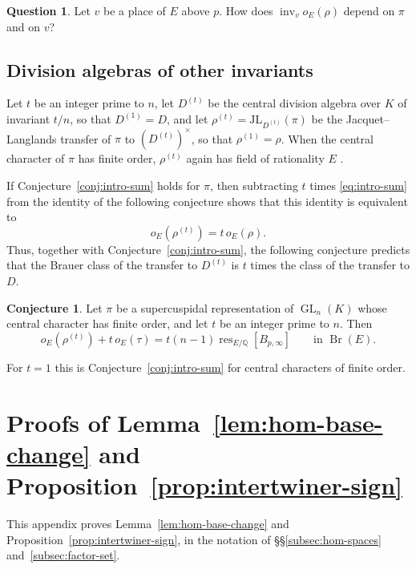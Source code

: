 \documentclass[a4paper,11pt]{amsart}
\theoremstyle{definition}
\newtheorem{conjecture}[theorem]{Conjecture}
\newtheorem{question}[theorem]{Question}
\theoremstyle{remark}
\numberwithin{equation}{section}
\newcommand{\Q}{\mathbb{Q}}
\DeclareMathOperator{\Br}{Br}
\DeclareMathOperator{\inv}{inv}
\DeclareMathOperator{\res}{res}
\DeclareMathOperator{\GL}{GL}
\newcommand{\JL}{\mathrm{JL}}
\newcommand{\Bpinf}{B_{p,\infty}}
\begin{document}
\begin{question}\label{q:individual}
Let $v$ be a place of $E$ above $p$. How does $\inv_vo_E(\rho)$ depend on $\pi$ and on $v$?
\end{question}

\subsection{Division algebras of other invariants}\label{subsec:questions-inner}

Let $t$ be an integer prime to $n$, let $D^{(t)}$ be the central division algebra over $K$ of invariant $t/n$, so that $D^{(1)}=D$, and let $\rho^{(t)}=\JL_{D^{(t)}}(\pi)$ be the Jacquet--Langlands transfer of $\pi$ to $(D^{(t)})^\times$, so that $\rho^{(1)}=\rho$. When the central character of $\pi$ has finite order, $\rho^{(t)}$ again has field of rationality $E$ \cite[Lemma~4.0.3]{Su23}.

If Conjecture~\ref{conj:intro-sum} holds for $\pi$, then subtracting $t$ times \eqref{eq:intro-sum} from the identity of the following conjecture shows that this identity is equivalent to
\[
 o_E(\rho^{(t)})=t\,o_E(\rho).
\]
Thus, together with Conjecture~\ref{conj:intro-sum}, the following conjecture predicts that the Brauer class of the transfer to $D^{(t)}$ is $t$ times the class of the transfer to $D$.

\begin{conjecture}\label{conj:questions-inner-forms}
Let $\pi$ be a supercuspidal representation of $\GL_n(K)$ whose central character has finite order, and let $t$ be an integer prime to $n$. Then
\[
 o_E(\rho^{(t)})+t\,o_E(\tau)=t(n-1)\res_{E/\Q}[\Bpinf]\qquad\text{in }\Br(E).
\]
\end{conjecture}

For $t=1$ this is Conjecture~\ref{conj:intro-sum} for central characters of finite order.

\appendix

\section{Proofs of \texorpdfstring{Lemma~\ref{lem:hom-base-change} and Proposition~\ref{prop:intertwiner-sign}}{Lemma 2.5 and Proposition 2.12}}
\label{app:section-two-proofs}

This appendix proves Lemma~\ref{lem:hom-base-change} and Proposition~\ref{prop:intertwiner-sign}, in the notation of \S\S\ref{subsec:hom-spaces} and~\ref{subsec:factor-set}.
\end{document}
